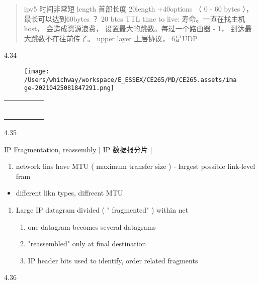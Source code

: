 \documentclass[
]{article}
\begin{document}
\begin{quote}
ipv5 时间非常短 length 首部长度 20length +40options （ 0 - 60 bytes ），
最长可以达到60bytes ？ 20 btes TTL time to live:
寿命。一直在找主机host， 会造成资源浪费， 设置最大的跳数。每过一个路由器
- 1， 到达最大跳数不在往前传了。 upper layer 上层协议， 6是UDP
\end{quote}

4.34

\begin{figure}
\centering
\texttt{[image: /Users/whichway/workspace/E\_ESSEX/CE265/MD/CE265.assets/image-20210425081847291.png]}
\caption{}
\end{figure}

\begin{longtable}[]{@{}lllll@{}}
\toprule
& & & &\tabularnewline
\midrule
\endhead
& & & &\tabularnewline
& & & &\tabularnewline
& & & &\tabularnewline
& & & &\tabularnewline
& & & &\tabularnewline
& & & &\tabularnewline
\bottomrule
\end{longtable}

4.35

IP Fragmentation, reassembly {[} IP 数据报分片 {]}

\begin{enumerate}
\def\labelenumi{\arabic{enumi}.}
\item
  network lins have MTU ( maximum transfer size ) - largest possible
  link-level fram
\end{enumerate}

\begin{itemize}
\item
  different likn types, diffreent MTU
\end{itemize}

\begin{enumerate}
\def\labelenumi{\arabic{enumi}.}
\item
  Large IP datagram divided ( " fragmented" ) within net

  \begin{enumerate}
  \def\labelenumii{\arabic{enumii}.}
  \item
    one datagram becomes several datagrams
  \item
    "reassembled" only at final destination
  \item
    IP header bits used to identify, order related fragments
  \end{enumerate}
\end{enumerate}

4.36
\end{document}
